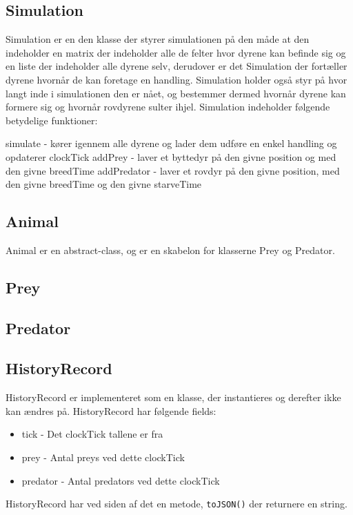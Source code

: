 \documentclass[a4paper]{article}
\begin{document}
    \subsection*{Simulation}
    Simulation er en den klasse der styrer simulationen på den måde at den indeholder en matrix der indeholder
    alle de felter hvor dyrene kan befinde sig og en liste der indeholder alle dyrene selv, derudover er det
    Simulation der fortæller dyrene hvornår de kan foretage en handling. Simulation holder også styr på hvor
    langt inde i simulationen den er nået, og bestemmer dermed hvornår dyrene kan formere sig og hvornår
    rovdyrene sulter ihjel. Simulation indeholder følgende betydelige funktioner:

    \begin{itemize}
      \list simulate - kører igennem alle dyrene og lader dem udføre en enkel handling og opdaterer clockTick
      \list addPrey - laver et byttedyr på den givne position og med den givne breedTime
      \list addPredator - laver et rovdyr på den givne position, med den givne breedTime og den givne starveTime
    \end{itemize}
    
    \subsection*{Animal}
      Animal er en abstract-class, og er en skabelon for klasserne Prey og 
      Predator. 
    
    \subsection*{Prey}
    
    \subsection*{Predator}
    
    \subsection*{HistoryRecord}
      HistoryRecord er implementeret som en klasse, der instantieres og derefter ikke kan ændres på.
      HistoryRecord har følgende fields:
      \begin{itemize}
        \item tick - Det clockTick tallene er fra
        \item prey - Antal preys ved dette clockTick
        \item predator - Antal predators ved dette clockTick
      \end{itemize}
      HistoryRecord har ved siden af det en metode, \lstinline$toJSON()$ der returnere en string.
      
\end{document}
